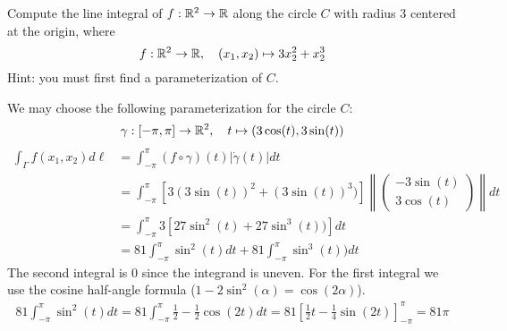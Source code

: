 \documentclass[11pt]{article}
\begin{document}
\begin{exercise}
    Compute the line integral of $f : \mathbb{R}^2 \rightarrow \mathbb{R}$ 
    along the circle $C$ with radius $3$ centered at the origin, where 
    \[
        f : \mathbb{R}^2 \to \mathbb{R}, \quad (x_1,x_2) \mapsto 3 x_2^2 + x_2^3
    \]
    Hint: you must first find a parameterization of $C$. 
\end{exercise}
\begin{solution} 
	We may choose the following parameterization for the circle $C$:
    $$
        \gamma : [-\pi,\pi] \rightarrow \mathbb{R}^2, \quad t \mapsto ( 3\cos(t), 3\sin(t) )
    $$
    \begin{align*}
        \int_{\Gamma} f(x_1,x_2) d\ell &= \int_{-\pi}^{\pi} (f\circ \gamma)(t)|\dot{\gamma}(t)|dt
        \\&=
        \int_{-\pi}^{\pi} \left[3(3\sin(t))^2+(3\sin(t))^3)\right]\left\|\begin{pmatrix}-3\sin(t)\\3\cos(t)\end{pmatrix}\right\| dt
        \\&=
        \int_{-\pi}^{\pi} 3\left[27\sin^2(t)+27\sin^3(t))\right]dt
        \\&=
        81\int_{-\pi}^{\pi} \sin^2(t)dt+ 81\int_{-\pi}^{\pi}\sin^3(t))dt
    \end{align*}
    The second integral is $0$ since the integrand is uneven. For the first integral we use the cosine half-angle formula ($1 - 2\sin^2(\alpha) = \cos(2\alpha)$).
    \begin{align*}
        81\int_{-\pi}^{\pi} \sin^2(t)dt
		= 81\int_{-\pi}^{\pi} \frac{1}{2} - \frac{1}{2}\cos(2t)dt
        = 81 \left[ \frac{1}{2} t - \frac{1}{4}\sin(2t) \right]_{-\pi}^{\pi} = 81\pi
    \end{align*}
\end{solution}
\end{document}
